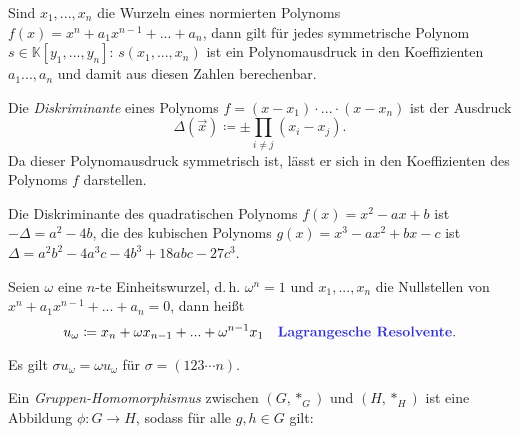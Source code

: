 \documentclass{cheat-sheet}
\newcommand{\K}{\mathbb{K}} %
\begin{document}
\begin{kor}
  Sind $x_1, ..., x_n$ die Wurzeln eines normierten Polynoms $f(x) = x^n + a_1 x^{n-1} + ... + a_n$, dann gilt für jedes symmetrische Polynom $s \in \K[y_1, ..., y_n]$: $s(x_1, ..., x_n)$ ist ein Polynomausdruck in den Koeffizienten $a_1 ..., a_n$ und damit aus diesen Zahlen berechenbar.
\end{kor}

\begin{defn}
  Die \emph{Diskriminante} eines Polynoms $f = (x - x_1) \cdot ... \cdot (x - x_n)$ ist der Ausdruck
  \[ \Delta (\vec{x}) \coloneqq \pm \prod_{i \not= j} (x_i - x_j). \]
  Da dieser Polynomausdruck symmetrisch ist, lässt er sich in den Koeffizienten des Polynoms $f$ darstellen.
\end{defn}

\begin{bsp}
  Die Diskriminante des quadratischen Polynoms $f(x) = x^2 - ax + b$ ist $- \Delta = a^2 - 4 b$, die des kubischen Polynoms $g(x) = x^3 - a x^2 + b x - c$ ist $\Delta = a^2 b^2 - 4 a^3 c - 4 b^3 + 18 abc - 27 c^3$.
\end{bsp}



\begin{defn}
  Seien $\omega$ eine $n$-te Einheitswurzel, d.\,h. $\omega^n = 1$ und $x_1, ..., x_n$ die Nullstellen von $x^n + a_1 x^{n-1} + ... + a_n = 0$, dann heißt
  \[
    u_{\omega} \coloneqq x_n + \omega x_{n-1} + ... + \omega^{n-1} x_1 \quad
    \text{\emph{Lagrangesche Resolvente}.}
  \]
\end{defn}

\begin{bem}
  Es gilt $\sigma u_{\omega} = \omega u_{\omega}$ für $\sigma = (123 \cdots n)$.
\end{bem}




\begin{defn}
  Ein \emph{Gruppen-Homomorphismus} zwischen $(G, *_G)$ und $(H, *_H)$ ist eine Abbildung $\phi : G \to H$, sodass für alle $g, h \in G$ gilt:
  \begin{itemize}
  \end{itemize}
\end{defn}
\end{document}

